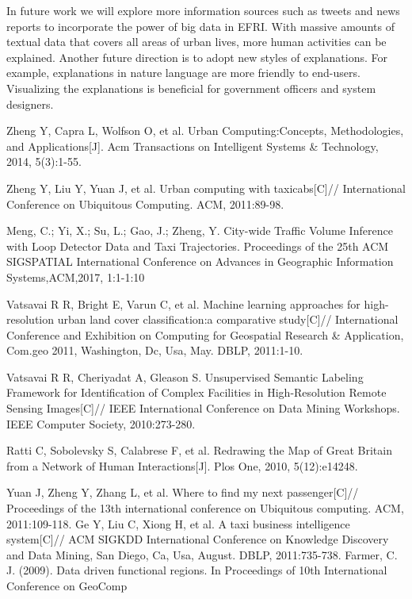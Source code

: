 \documentclass[runningheads]{llncs}
\begin{document}
In future work we will explore more information sources such as tweets and news reports to incorporate the power of big data in EFRI.
With massive amounts of textual data that covers all areas of urban lives, more human activities can be explained.
Another future direction is to adopt new styles of explanations. 
For example, explanations in nature language are more friendly to end-users.
Visualizing the explanations is beneficial for government officers and system designers.


\begin{thebibliography}{25}
Zheng Y, Capra L, Wolfson O, et al. Urban Computing:Concepts, Methodologies, and Applications[J]. Acm Transactions on Intelligent Systems \& Technology, 2014, 5(3):1-55.
  
Zheng Y, Liu Y, Yuan J, et al. Urban computing with taxicabs[C]// International Conference on Ubiquitous Computing. ACM, 2011:89-98.
   
Meng, C.; Yi, X.; Su, L.; Gao, J.; Zheng, Y. City-wide Traffic Volume Inference with Loop Detector Data and Taxi Trajectories. Proceedings of the 25th ACM SIGSPATIAL International Conference on Advances in Geographic Information Systems,ACM,2017, 1:1-1:10


Vatsavai R R, Bright E, Varun C, et al. Machine learning approaches for high-resolution urban land cover classification:a comparative study[C]// International Conference and Exhibition on Computing for Geospatial Research \& Application, Com.geo 2011, Washington, Dc, Usa, May. DBLP, 2011:1-10.

Vatsavai R R, Cheriyadat A, Gleason S. Unsupervised Semantic Labeling Framework for Identification of Complex Facilities in High-Resolution Remote Sensing Images[C]// IEEE International Conference on Data Mining Workshops. IEEE Computer Society, 2010:273-280.
 

Ratti C, Sobolevsky S, Calabrese F, et al. Redrawing the Map of Great Britain from a Network of Human Interactions[J]. Plos One, 2010, 5(12):e14248.

Yuan J, Zheng Y, Zhang L, et al. Where to find my next passenger[C]// Proceedings of the 13th international conference on Ubiquitous computing. ACM, 2011:109-118.
Ge Y, Liu C, Xiong H, et al. A taxi business intelligence system[C]// ACM SIGKDD International Conference on Knowledge Discovery and Data Mining, San Diego, Ca, Usa, August. DBLP, 2011:735-738.
Farmer, C. J. (2009). Data driven functional regions. In Proceedings of 10th International Conference on GeoComp
 

\end{thebibliography}
\end{document}
